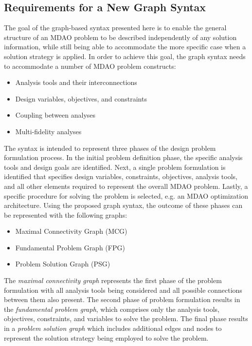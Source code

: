 \subsection{Requirements for a New Graph Syntax}
  \label{s:requirements}
  The goal of the graph-based syntax presented here is to enable the general 
  structure of an MDAO problem to be described independently of any solution information, 
  while still being able to accommodate the more specific case when a solution 
  strategy is applied. In order to achieve this goal, 
  the graph syntax needs to accommodate a number of MDAO problem constructs: 
  \begin{itemize}
    \item Analysis tools and their interconnections
    \item Design variables, objectives, and constraints
    \item Coupling between analyses
    \item Multi-fidelity analyses
  \end{itemize}

  The syntax is intended to represent three phases of the design problem 
  formulation process. In the initial problem definition phase, the specific 
  analysis tools and design goals are identified. Next, a single problem 
  formulation is identified that specifies design variables, constraints, 
  objectives, analysis tools, and all other elements required to represent 
  the overall MDAO problem. Lastly, a specific procedure for solving the problem 
  is selected, e.g. an MDAO optimization architecture. Using 
  the proposed graph syntax, the outcome of these phases can be represented with the following graphs:
  \begin{itemize}
    \item Maximal Connectivity Graph (MCG)
    \item Fundamental Problem Graph (FPG)
    \item Problem Solution Graph (PSG)
  \end{itemize}

  The \emph{maximal connectivity graph} represents the first phase of the problem 
  formulation with all analysis tools being considered and all possible connections 
  between them also present. The second phase of problem formulation results in the \emph{fundamental problem graph}, 
  which comprises only the analysis tools, objectives, constraints, and variables to solve the problem. 
  The final phase results in a \emph{problem solution graph} which includes additional 
  edges and nodes to represent the solution strategy being employed to solve the 
  problem.

